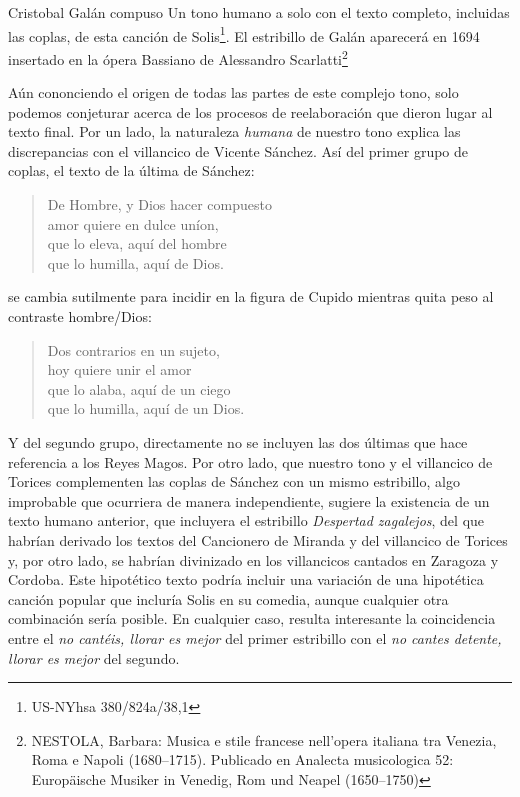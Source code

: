 Cristobal Galán compuso Un tono humano a solo con el texto completo, incluidas las coplas, de esta canción de Solis\footnote{US-NYhsa 380/824a/38,1}. El estribillo de Galán aparecerá en 1694 insertado en la ópera Bassiano de Alessandro Scarlatti\footnote{NESTOLA, Barbara: Musica e stile francese nell’opera italiana tra Venezia, Roma e Napoli (1680–1715). Publicado en Analecta musicologica 52: Europäische Musiker in Venedig, Rom und Neapel (1650–1750)}

Aún cononciendo el origen de todas las partes de este complejo tono, solo podemos conjeturar acerca de los procesos de reelaboración que dieron lugar al texto final. Por un lado, la naturaleza \textit{humana} de nuestro tono explica las discrepancias con el villancico de Vicente Sánchez. Así del primer grupo de coplas, el texto de la última de Sánchez:

\begingroup
\centering
\itshape
\setlength{\vrightskip}{-3em}
\begin{verse}
De Hombre, y Dios hacer compuesto\\
amor quiere en dulce uníon,\\
que lo eleva, aquí del hombre \\
que lo humilla, aquí de Dios.\\
\end{verse}
\endgroup


se cambia sutilmente para incidir en la figura de Cupido mientras quita peso al contraste hombre/Dios:

\begingroup
\centering
\itshape
\setlength{\vrightskip}{-3em}
\begin{verse}
Dos contrarios en un sujeto,\\
hoy quiere unir el amor\\
que lo alaba, aquí de un ciego\\
que lo humilla, aquí de un Dios.\\
\end{verse}
\endgroup

Y del segundo grupo, directamente no se incluyen las dos últimas que hace referencia a los Reyes Magos. Por otro lado, que nuestro tono y el villancico de Torices complementen las coplas de Sánchez con un mismo estribillo, algo improbable que ocurriera de manera independiente, sugiere la existencia de un texto humano anterior, que incluyera el estribillo \textit{Despertad zagalejos}, del que habrían derivado los textos del Cancionero de Miranda y del villancico de Torices y, por otro lado, se habrían divinizado en los villancicos cantados en Zaragoza y Cordoba. Este hipotético texto podría incluir una variación de una hipotética canción popular que incluría Solis en su comedia, aunque cualquier otra combinación sería posible. En cualquier caso, resulta interesante la coincidencia entre el \textit{no cantéis,
llorar es mejor} del primer estribillo con el \textit{no cantes detente, llorar es mejor} del segundo.


